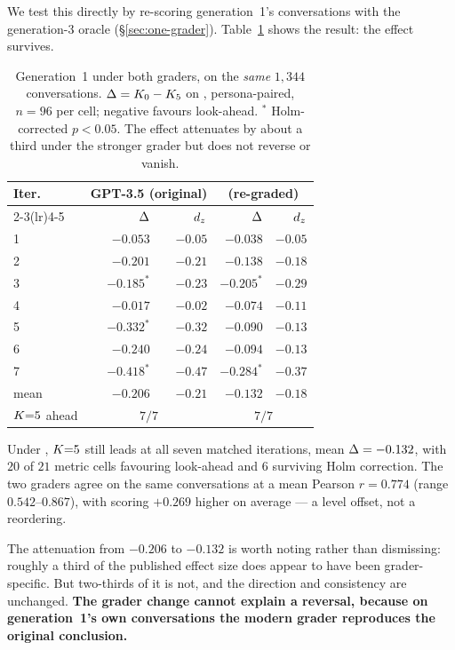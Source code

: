 We test this directly by re-scoring generation~1's conversations with the generation-3 oracle
(\S\ref{sec:one-grader}). Table~\ref{tab:gen1-graders} shows the result: the effect survives.

\begin{table}[t]
\centering\small
\begin{tabular}{@{}lrrrr@{}}
\toprule
\textbf{Iter.} & \multicolumn{2}{c}{\textbf{GPT-3.5} (original)} & \multicolumn{2}{c}{\textbf{\primaryjudge{}} (re-graded)} \\
\cmidrule(lr){2-3}\cmidrule(lr){4-5}
 & $\Delta$ & $d_z$ & $\Delta$ & $d_z$ \\
\midrule
1 & $-0.053$ & $-0.05$ & $-0.038$ & $-0.05$ \\
2 & $-0.201$ & $-0.21$ & $-0.138$ & $-0.18$ \\
3 & $-0.185^{*}$ & $-0.23$ & $-0.205^{*}$ & $-0.29$ \\
4 & $-0.017$ & $-0.02$ & $-0.074$ & $-0.11$ \\
5 & $-0.332^{*}$ & $-0.32$ & $-0.090$ & $-0.13$ \\
6 & $-0.240$ & $-0.24$ & $-0.094$ & $-0.13$ \\
7 & $-0.418^{*}$ & $-0.47$ & $-0.284^{*}$ & $-0.37$ \\
\midrule
mean & $\mathbf{-0.206}$ & $-0.21$ & $\mathbf{-0.132}$ & $-0.18$ \\
$K{=}5$ ahead & \multicolumn{2}{c}{$7/7$} & \multicolumn{2}{c}{$7/7$} \\
\bottomrule
\end{tabular}
\caption{Generation~1 under both graders, on the \emph{same} $1{,}344$ conversations.
$\Delta = K_0 - K_5$ on \QQ{}, persona-paired, $n = 96$ per cell; negative favours look-ahead.
$^{*}$ Holm-corrected $p < 0.05$. The effect attenuates by about a third under the stronger
grader but does not reverse or vanish.}
\label{tab:gen1-graders}
\end{table}

Under \primaryjudge{}, $K{=}5$ still leads at all seven matched iterations, mean
$\Delta = -0.132$, with $20$ of $21$ metric cells favouring look-ahead and $6$ surviving Holm
correction. The two graders agree on the same conversations at a mean Pearson
$r = 0.774$ (range $0.542$--$0.867$), with \primaryjudge{} scoring $+0.269$ higher on average
--- a level offset, not a reordering.

The attenuation from $-0.206$ to $-0.132$ is worth noting rather than dismissing: roughly a
third of the published effect size does appear to have been grader-specific. But two-thirds of
it is not, and the direction and consistency are unchanged. \textbf{The grader change cannot
explain a reversal, because on generation~1's own conversations the modern grader reproduces
the original conclusion.}

